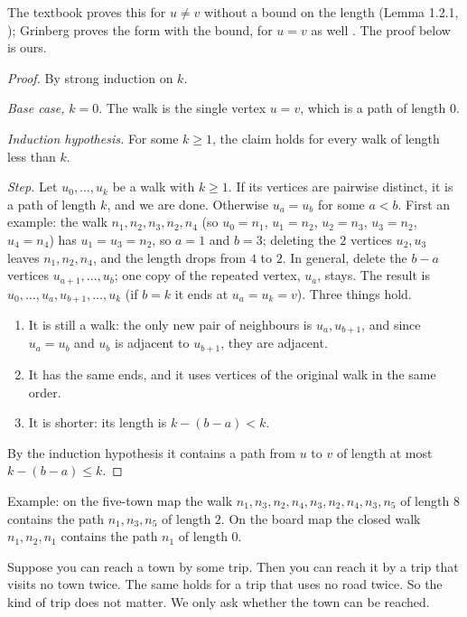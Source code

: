 The textbook proves this for $u\ne v$ without a bound on the length
(Lemma 1.2.1, \cite[p.~23]{petrosyan2015grafneri}); Grinberg proves the form
with the bound, for $u=v$ as well \cite[Corollary 2.9.7,
p.~39]{grinberg2025introduction}. The proof below is ours.

\begin{proof}
By strong induction on $k$.

\emph{Base case,} $k=0$. The walk is the single vertex $u=v$, which is a path
of length $0$.

\emph{Induction hypothesis.} For some $k\ge1$, the claim holds for every walk
of length less than $k$.

\emph{Step.} Let $u_0,\dots,u_k$ be a walk with $k\ge1$. If its vertices are
pairwise distinct, it is a path of length $k$, and we are done. Otherwise
$u_a=u_b$ for some $a<b$. First an example: the walk $n_1,n_2,n_3,n_2,n_4$ (so $u_0=n_1$, $u_1=n_2$, $u_2=n_3$, $u_3=n_2$,
$u_4=n_4$) has $u_1=u_3=n_2$, so $a=1$ and $b=3$; deleting the $2$ vertices
$u_2,u_3$ leaves $n_1,n_2,n_4$, and the length drops from $4$ to $2$. In general, delete the $b-a$
vertices $u_{a+1},\dots,u_b$; one copy of the repeated vertex, $u_a$, stays.
The result is $u_0,\dots,u_a,u_{b+1},\dots,u_k$ (if $b=k$ it ends at
$u_a=u_k=v$). Three things hold.
\begin{enumerate}
\item[(i)] It is still a walk: the only new pair of neighbours is
  $u_a,u_{b+1}$, and since $u_a=u_b$ and $u_b$ is adjacent to $u_{b+1}$, they
  are adjacent.
\item[(ii)] It has the same ends, and it uses vertices of the original walk in
  the same order.
\item[(iii)] It is shorter: its length is $k-(b-a)<k$.
\end{enumerate}
By the induction hypothesis it contains a path from $u$ to $v$ of length at most
$k-(b-a)\le k$. \qedhere
\end{proof}

Example: on the five-town map the walk $n_1,n_3,n_2,n_4,n_3,n_2,n_4,n_3,n_5$
of length $8$ contains the path $n_1,n_3,n_5$ of length $2$. On the board
map the closed walk $n_1,n_2,n_1$ contains the path $n_1$ of length $0$.

\plain Suppose you can reach a town by some trip. Then you can reach it by a
trip that visits no town twice. The same holds for a trip that uses no road
twice. So the kind of trip does not matter. We only ask whether the town can
be reached.

